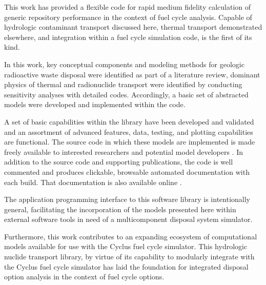 This work has provided a flexible code for rapid medium fidelity calculation
of generic repository performance in the context of fuel cycle analysis.
Capable of hydrologic contaminant transport discussed here, thermal transport
demonstrated elsewhere, and integration within a fuel cycle simulation code,
\Cyder is the first of its kind.

In this work, key conceptual components and modeling methods for geologic
radioactive waste disposal were identified as part of a literature review,
dominant physics of thermal and radionuclide transport were identified by
conducting sensitivity analyses with detailed codes. Accordingly, a basic set
of abstracted models were developed and implemented within the \Cyder code.

A set of basic capabilities within the \Cyder library have been developed and
validated and an assortment of advanced features, data, testing, and plotting
capabilities are functional. The \Cyder source code in which these models are
implemented is made freely available to interested researchers and potential
model developers \cite{huff_cyder_2013}. In addition to the source code and
supporting publications, the \Cyder code is well commented and produces
clickable, browsable automated documentation with each build. That
documentation is also available online \cite{huff_cyder_2013}.

The application programming interface to this software library is intentionally
general, facilitating the incorporation of the models presented here within
external software tools in need of a multicomponent disposal system simulator.

Furthermore, this work contributes to an expanding ecosystem of computational
models available for use with the Cyclus fuel cycle simulator. This hydrologic
nuclide transport library, by virtue of its capability to modularly integrate
with the Cyclus fuel cycle simulator has laid the foundation for integrated
disposal option analysis in the context of fuel cycle options.
